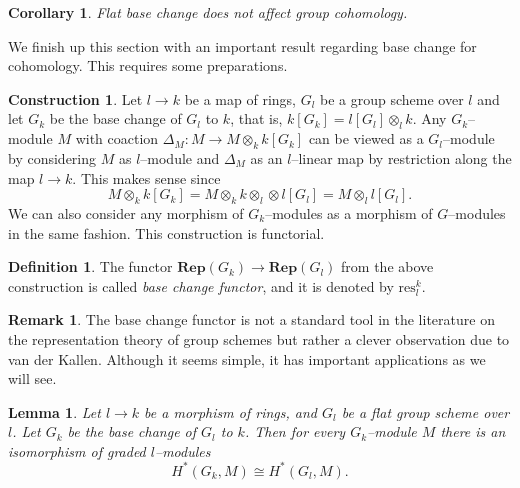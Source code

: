 \documentclass{article}
\theoremstyle{plain}
\newtheorem{Lemma}[Th]{Lemma}
\newtheorem{Cor}[Th]{Corollary}
\theoremstyle{definition}
\newtheorem{Def}[Th]{Definition}
\newtheorem{Rem}[Th]{Remark}
\newtheorem{construction}[Th]{Construction}
\begin{document}
\begin{Cor}\label{Flat base change}
    Flat base change does not affect group cohomology.
\end{Cor}



We finish up this section with an important result regarding base change for cohomology. This requires some preparations.

\begin{construction}
    Let $l\to k$ be a map of rings, $G_l$ be a group scheme over $l$ and let $G_k$ be the base change of $G_l$ to $k$, that is, $k[G_k]=l[G_l]\otimes_l k$.  Any $G_k$--module $M$ with coaction $\Delta_M\colon M\to  M\otimes_k k[G_k]$ can be viewed as a $G_l$--module  by considering $M$ as $l$--module and $\Delta_M$ as an $l$--linear map by restriction along the map $l\to k$. This makes sense since 
    \[
    M\otimes_k k[G_k]=M \otimes_k k \otimes_l \otimes l[G_l]=M \otimes_l l[G_l].
    \]
    We can also consider any morphism of $G_k$--modules as a morphism of $G$--modules in the same fashion. This construction is functorial. 
\end{construction}

\begin{Def}
  The functor $\mathbf{Rep}(G_k)\to \mathbf{Rep}(G_l)$ from the above construction is called \textit{base change functor}, and it is denoted by $\mathrm{res}^k_l$. 
\end{Def}

\begin{Rem}
    The base change functor is not a standard tool in the literature on the representation theory of group schemes but rather a clever observation due to van der Kallen. Although it seems simple, it has important applications as we will see.  
\end{Rem}

\begin{Lemma}\label{base change}
    Let $l\to k$ be a morphism of rings, and $G_l$ be a flat group scheme over $l$. Let $G_k$ be the base change of $G_l$ to $k$. Then for every $G_k$--module $M$ there is an isomorphism of graded $l$--modules 
    \[
    H^\ast(G_k,M)\cong H^\ast(G_l,M).
    \]
\end{Lemma}
\end{document}
